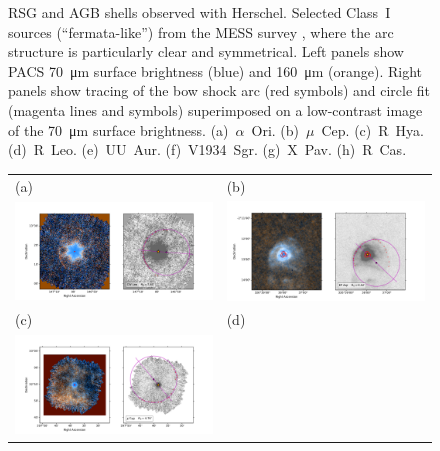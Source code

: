 \begin{figure}
\begin{tabular}{@{}ll@{}}
  \end{tabular}
  \caption{RSG and AGB shells observed with Herschel.  Selected
    Class~I sources (``fermata-like'') from the MESS survey
    \citet{Cox:2012a}, where the arc structure is particularly clear
    and symmetrical.  Left panels show PACS \SI{70}{\um} surface
    brightness (blue) and \SI{160}{\um} (orange).  Right panels show
    tracing of the bow shock arc (red symbols) and circle fit (magenta
    lines and symbols) superimposed on a low-contrast image of the
    \SI{70}{\um} surface brightness. (a)~\(\alpha\)~Ori. (b)~\(\mu\)~Cep.
    (c)~R~Hya. (d)~R~Leo. (e)~UU~Aur. (f)~V1934~Sgr. (g)~X~Pav.
    (h)~R~Cas.}
  \label{fig:herschel-arc-fits}
\end{figure}

\begin{figure}
  \centering
  \begin{tabular}{@{}ll@{}}
    (a) & (b) \\
    \includegraphics[trim=10 0 60 30, clip]{figs/cwleo-imageplot}
    & \includegraphics[trim=10 0 60 30, clip]{figs/epaqr-imageplot} \\
    (c) & (d) \\
    \includegraphics[trim=10 0 60 30, clip]{figs/khicyg-imageplot}

\end{tabular}
\end{figure}
